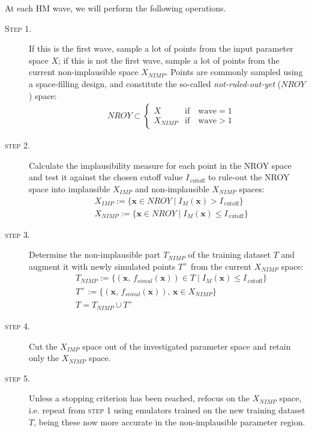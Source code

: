 \vspace{0.2cm}\noindent
At each HM wave, we will perform the following operations.

\begin{description}
    \item[\textsc{Step 1.}] If this is the first wave, sample a lot of points from the input parameter space $X$; if this is not the first wave, sample a lot of points from the current non-implausible space $X_{NIMP}$. Points are commonly sampled using a space-filling design, and constitute the so-called \textit{not-ruled-out-yet} ($NROY$) space:
    \begin{align*}
        & NROY\subset\begin{cases}
        X &\text{if}\quad \text{wave}=1 \\
        X_{NIMP} &\text{if}\quad \text{wave}>1
        \end{cases}
    \end{align*} 
    \item[\textsc{step 2.}] Calculate the implausibility measure for each point in the NROY space and test it against the chosen cutoff value $I_{\,\text{cutoff}}$ to rule-out the NROY space into implausible $X_{IMP}$ and non-implausible $X_{NIMP}$ spaces:
    \begin{align*}
        & X_{IMP} := \{\mathbf{x}\in NROY\;\vert\;I_{M}(\mathbf{x}) > I_{\,\text{cutoff}}\} \\
        & X_{NIMP} := \{\mathbf{x}\in NROY\;\vert\;I_{M}(\mathbf{x}) \le I_{\,\text{cutoff}}\}
    \end{align*}
    \item[\textsc{step 3.}] Determine the non-implausible part $T_{NIMP}$ of the training dataset $T$ and augment it with newly simulated points $T^{+}$ from the current $X_{NIMP}$ space:
    \begin{align*}
        & T_{NIMP} := \{(\mathbf{x},\,f_{simul}(\mathbf{x}))\in T\;\vert\;I_{M}(\mathbf{x}) \le I_{\,\text{cutoff}}\} \\
        & T^{+} := \{(\mathbf{x},\,f_{simul}(\mathbf{x})),\,\mathbf{x}\in X_{NIMP}\} \\
        & T = T_{NIMP}\cup T^{+}
    \end{align*}
    \item[\textsc{step 4.}] Cut the $X_{IMP}$ space out of the investigated parameter space and retain only the $X_{NIMP}$ space.
    \item[\textsc{step 5.}] Unless a stopping criterion has been reached, refocus on the $X_{NIMP}$ space, i.e. repeat from \textsc{step 1} using emulators trained on the new training dataset $T$, being these now more accurate in the non-implausible parameter region.
\end{description}

